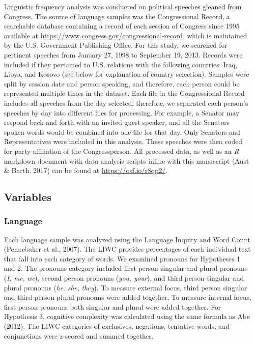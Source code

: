 \documentclass[english,,man,floatsintext]{apa6}
\begin{document}
Linguistic frequency analysis was conducted on political speeches gleaned from Congress. The source of language samples was the Congressional Record, a searchable database containing a record of each session of Congress since 1995 available at \url{https://www.congress.gov/congressional-record}, which is maintained by the U.S. Government Publishing Office. For this study, we searched for pertinent speeches from January 27, 1998 to September 19, 2013. Records were included if they pertained to U.S. relations with the following countries: Iraq, Libya, and Kosovo (see below for explanation of country selection). Samples were split by session date and person speaking, and therefore, each person could be represented multiple times in the dataset. Each file in the Congressional Record includes all speeches from the day selected, therefore, we separated each person's speeches by day into different files for processing. For example, a Senator may respond back and forth with an invited guest speaker, and all the Senators spoken words would be combined into one file for that day. Only Senators and Representatives were included in this analysis. These speeches were then coded for party affiliation of the Congressperson. All processed data, as well as an \emph{R} markdown document with data analysis scripts inline with this manuscript (Aust \& Barth, 2017) can be found at \url{https://osf.io/r8qp2/}.

\hypertarget{variables}{%
\subsection{Variables}\label{variables}}

\hypertarget{language}{%
\subsubsection{Language}\label{language}}

Each language sample was analyzed using the Language Inquiry and Word Count (Pennebaker et al., 2007). The LIWC provides percentages of each individual text that fall into each category of words. We examined pronouns for Hypotheses 1 and 2. The pronouns category included first person singular and plural pronouns (\emph{I, me, we}), second person pronouns (\emph{you, your}), and third person singular and plural pronouns (\emph{he, she, they}). To measure external focus, third person singular and third person plural pronouns were added together. To measure internal focus, first person pronouns both singular and plural were added together. For Hypothesis 3, cognitive complexity was calculated using the same formula as Abe (2012). The LIWC categories of exclusives, negations, tentative words, and conjunctions were z-scored and summed together.
\end{document}
